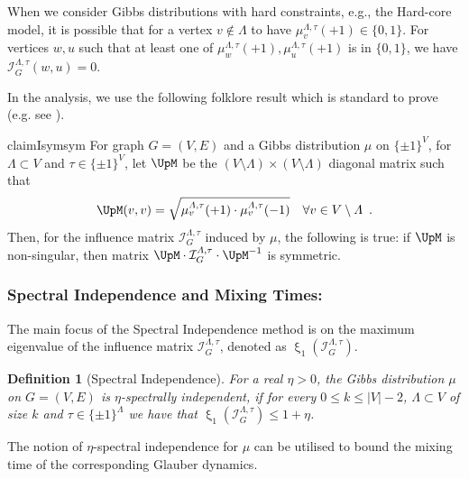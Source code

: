 \documentclass[11pt,reqno]{amsart}
\numberwithin{equation}{section}
\newtheorem{definition}[theorem]{Definition}
\newcommand{\cI}{{\mathcal{I}}}
\newcommand{\blue}[1]{{\color{blue}#1}}
\newcommand{\bluepigment}[1]{{\color{blue(pigment)}#1}}
\newcommand{\electricviolet}[1]{{\color{electricviolet}#1}}
\newcommand{\red}[1]{{\color{red}#1}}
\newcommand{\infmatrix}{\cI}
\newcommand{\eigenval}{\upxi}
\renewcommand{\blue}[1]{#1}
\renewcommand{\bluepigment}[1]{#1}
\renewcommand{\electricviolet}[1]{#1}
\renewcommand{\red}[1]{#1}
\newcommand{\kk}{\bluepigment{k}}
\newcommand{\ku}{\red{u}}
\newcommand{\kv}{\electricviolet{v}}
\newcommand{\kw}{\blue{w}}
\renewcommand{\kk}{k}
\renewcommand{\ku}{u}
\renewcommand{\kv}{v}
\renewcommand{\kw}{w}
\begin{document}
When we consider Gibbs distributions with hard constraints, e.g., the Hard-core model, it is possible  that for a 
vertex  $\kv\notin \Lambda$ to have $\mu^{\Lambda,\tau}_{\kv}(+1)\in \{0,1\}$.  For vertices $\kw,\ku$ such that 
at least one of $\mu^{\Lambda,\tau}_{\kw}(+1),\mu^{\Lambda,\tau}_{\ku}(+1)$ is in $\{0,1\}$, we have  
$\infmatrix^{\Lambda,\tau}_{G}(\kw,\ku)=0$. 




In the analysis, we use the following folklore result which is standard to prove (e.g. see ). 

\begin{restatable}{claim}{Isymsym}\label{claim:InfSymmetrisation}
For graph $G=(V,E)$ and a Gibbs distribution $\mu$ on $\{\pm 1\}^V$, 
%
for $\Lambda\subset V$ and $\tau\in \{\pm 1\}^V$, let $\UpM$ be the $(V\setminus \Lambda)\times (V\setminus \Lambda)$
diagonal matrix such that 
\begin{align}\nonumber
\UpM(\kv,\kv) &\textstyle =\sqrt{\mu^{\Lambda,\tau}_{\kv}(+1)\cdot \mu^{\Lambda,\tau}_{\kv}(-1)} &\forall \kv\in V\setminus \Lambda \enspace.
\end{align}
Then, for the influence matrix $\infmatrix^{\Lambda,\tau}_G$ induced by $\mu$, the following is true:
if $\UpM$ is non-singular, then matrix $\UpM\cdot \infmatrix^{\Lambda,\tau}_G \cdot \UpM^{-1}$ is symmetric. 
\end{restatable}
%
 


 


\subsubsection*{Spectral Independence and Mixing Times:}
The main focus of the Spectral Independence method is on  the maximum eigenvalue of the influence
matrix $\infmatrix^{\Lambda,\tau}_{G}$, denoted as $\eigenval_{1} (\infmatrix^{\Lambda,\tau}_{G})$.
 

\begin{definition}[Spectral Independence]\label{Def:SpInMu}
For a real $\eta>0$, the Gibbs distribution $\mu$ on $G=(V,E)$ is $\eta$-spectrally
independent, if for every $0\leq \kk\leq |V|-2$, $\Lambda\subset V$ of size $\kk$ and $\tau\in \{\pm 1\}^\Lambda$
we have that $\eigenval_{1}(\cI^{\Lambda,\tau}_{G})\leq 1+\eta$. 
\end{definition}



\noindent
The notion of $\eta$-spectral independence for $\mu$ can be utilised to bound the mixing time of the corresponding 
Glauber dynamics. 
\end{document}
